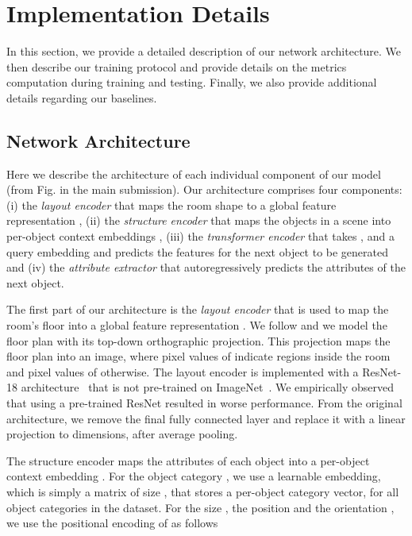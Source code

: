 \documentclass{article}
\newcommand{\boldparagraph}[1]{\vspace{0.2cm}\noindent{\bf #1:} }
\begin{document}
\section{Implementation Details}

In this section, we provide a detailed description of our network architecture.
We then describe our training protocol and provide
details on the metrics computation during training and testing.
Finally, we also provide additional details regarding our baselines.

\subsection{Network Architecture}
Here we describe the architecture of each individual component of our model
(from Fig.  in the main submission). Our architecture comprises four components:
(i) the \emph{layout encoder} that maps the
room shape to a global feature representation , (ii) the
\emph{structure encoder} that maps the  objects in a
scene into per-object context embeddings , (iii) the
\emph{transformer encoder} that takes ,  and a
query embedding  and predicts the features  for the next object
to be generated and (iv) the \emph{attribute extractor} that autoregressively
predicts the attributes of the next object. 

\boldparagraph{Layout Encoder}The first part of our architecture is the \emph{layout encoder} that is used to
map the room's floor into a global feature representation .
We follow \cite{Wang2018SIGGRAPH} and we model the
floor plan with its top-down orthographic projection. This projection
maps the floor plan into an image, where pixel values of 
indicate regions inside the room and pixel values of  otherwise.
The layout encoder is implemented with a ResNet-18
architecture~\cite{He2016CVPR} that is not pre-trained on
ImageNet~\cite{Deng2009CVPR}. We empirically observed that using a pre-trained
ResNet resulted in worse performance.  From the original architecture, we
remove the final fully connected layer and replace it with a linear projection to
 dimensions, after average pooling.

\boldparagraph{Structure Encoder}The structure encoder maps the attributes of each object into a per-object
context embedding . For the object category , we use a learnable
embedding, which is simply a matrix of size , that stores a
per-object category vector, for all  object categories in the dataset. 
For the size , the position  and the orientation
, we use the positional encoding of \cite{Vaswani2017NIPS} as follows
\end{document}
